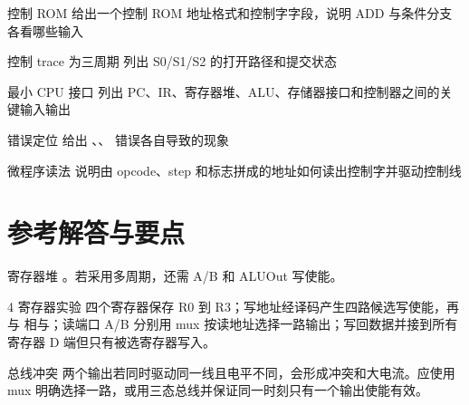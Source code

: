 \begin{chapterexercise}{控制 ROM}
给出一个控制 ROM 地址格式和控制字字段，说明 ADD 与条件分支各看哪些输入
\end{chapterexercise}

\begin{chapterexercise}{控制 trace}
为三周期  列出 S0/S1/S2 的打开路径和提交状态
\end{chapterexercise}

\begin{chapterexercise}{最小 CPU 接口}
列出 PC、IR、寄存器堆、ALU、存储器接口和控制器之间的关键输入输出
\end{chapterexercise}

\begin{chapterexercise}{错误定位}
给出 、、 错误各自导致的现象
\end{chapterexercise}

\begin{chapterexercise}{微程序读法}
说明由 opcode、step 和标志拼成的地址如何读出控制字并驱动控制线
\end{chapterexercise}

\section*{参考解答与要点}

\begin{chapteranswer}{寄存器堆}
。若采用多周期，还需 A/B 和 ALUOut 写使能。
\end{chapteranswer}

\begin{chapteranswer}{4 寄存器实验}
四个寄存器保存 R0 到 R3；写地址经译码产生四路候选写使能，再与  相与；读端口 A/B 分别用 mux 按读地址选择一路输出；写回数据并接到所有寄存器 D 端但只有被选寄存器写入。
\end{chapteranswer}

\begin{chapteranswer}{总线冲突}
两个输出若同时驱动同一线且电平不同，会形成冲突和大电流。应使用 mux 明确选择一路，或用三态总线并保证同一时刻只有一个输出使能有效。
\end{chapteranswer}

